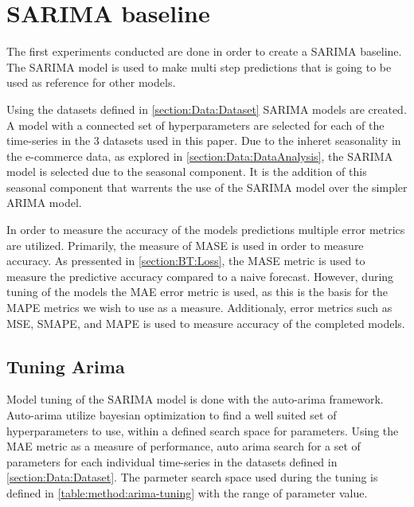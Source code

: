 
\section{SARIMA baseline}
\label{section:Method:SARIMA}

The first experiments conducted are done in order to create a SARIMA baseline.
The SARIMA model is used to make multi step predictions that is going to be used as reference for other models.

Using the datasets defined in \cref{section:Data:Dataset} SARIMA models are created.
A model with a connected set of hyperparameters are selected for each of the time-series in the 3 datasets used in this paper.
Due to the inheret seasonality in the e-commerce data, as explored in \cref{section:Data:DataAnalysis},
the SARIMA model is selected due to the seasonal component.
It is the addition of this seasonal component that warrents the use of the SARIMA model over the simpler ARIMA model.

In order to measure the accuracy of the models predictions multiple error metrics are utilized.
Primarily, the measure of MASE is used in order to measure accuracy.
As pressented in \cref{section:BT:Loss}, the MASE metric is used to measure the predictive accuracy
compared to a naive forecast.
However, during tuning of the models the MAE error metric is used, as this is the basis for the MAPE metrics we wish to use as a measure.
Additionaly, error metrics such as MSE, SMAPE, and MAPE is used to measure accuracy of the completed models.

\subsection{Tuning Arima}
Model tuning of the SARIMA model is done with the auto-arima framework.
Auto-arima utilize bayesian optimization to find a well suited set of hyperparameters to use,
within a defined search space for parameters.
Using the MAE metric as a measure of performance, auto arima search for a set of parameters for each individual time-series
in the datasets defined in \cref{section:Data:Dataset}.
The parmeter search space used during the tuning is defined in \cref{table:method:arima-tuning} with the range of parameter value.

